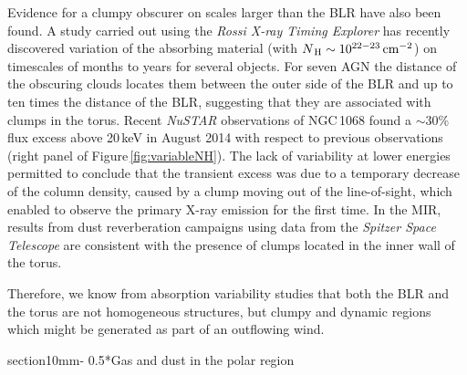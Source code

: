 \documentclass{natureprintstyle}
\makeatletter
\renewcommand{\section}{\@startsection%
{section}{1}{0mm}{-\baselineskip}%
{0.5\baselineskip}{\normalfont\Large\bfseries}}%
\makeatother
\begin{document}
Evidence for a clumpy obscurer on scales larger than the BLR have also been found. 
A study carried out using the {\it Rossi X-ray Timing Explorer} has recently discovered variation of the absorbing material (with $N_{\rm\,H}\sim 10^{22-23}\rm\,cm^{-2}$) on timescales of months to years  for several objects\cite{Markowitz:2014oq}. For seven AGN the distance of the obscuring clouds locates them between the outer side of the BLR and up to ten times the distance of the BLR, suggesting that they are associated with clumps in the torus. Recent {\it NuSTAR} observations of NGC\,1068\cite{Marinucci:2016eu} found a $\sim$30\% flux excess above 20\,keV in August 2014 with respect to previous observations (right panel of Figure\,\ref{fig:variableNH}). The lack of variability at lower energies permitted to conclude that the transient excess was due to a temporary decrease of the column density, caused by a clump moving out of the line-of-sight, which enabled to observe the primary X-ray emission for the first time. {In the MIR, results from dust reverberation campaigns using data from the {\it Spitzer Space Telescope} are consistent with the presence of clumps located in the inner wall of the torus\cite{Vazquez15}}.




Therefore, we know from absorption variability studies that both the BLR and the torus are not homogeneous structures, but clumpy and dynamic regions which might be generated as part of an outflowing wind. 

\section*{Gas and dust in the polar region}
\end{document}
